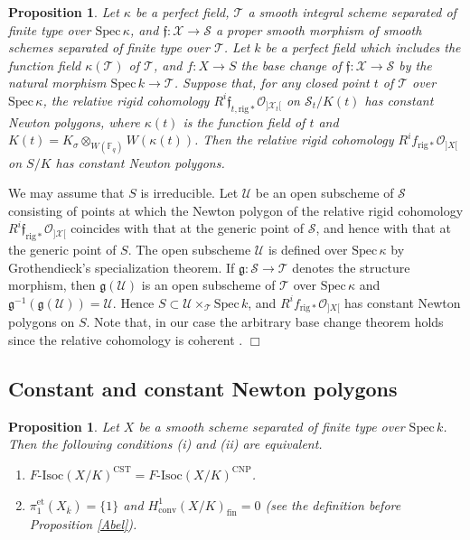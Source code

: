 \documentclass[11pt]{amsart}
\newtheorem{proposition}[Lemma]{Proposition}
\begin{document}
\begin{proposition}\label{geom} Let $\kappa$ be a perfect field, 
$\mathcal T$ a smooth integral scheme separated of finite type over 
$\mathrm{Spec}\, \kappa$, and $\mathfrak f : \mathcal X \rightarrow \mathcal S$ 
a proper smooth morphism of smooth schemes separated of finite type 
over $\mathcal T$. Let $k$ be a perfect field which includes 
the function field $\kappa(\mathcal T)$ of $\mathcal T$, and 
$f : X \rightarrow S$ the base change of $\mathfrak f : \mathcal X \rightarrow \mathcal S$ 
by the natural morphism $\mathrm{Spec}\, k \rightarrow \mathcal T$. 
Suppose that, for any closed point $t$ of $\mathcal T$ over $\mathrm{Spec}\, \kappa$, 
the relative rigid cohomology $R^i\mathfrak f_{t, \mathrm{rig}\ast}\mathcal O_{]{\mathcal X}_t[}$ 
on $\mathcal S_t/K(t)$ has constant Newton polygons, where 
$\kappa(t)$ is the function field of $t$ and 
$K(t) = K_\sigma\otimes_{W(\mathbb F_q)}W(\kappa(t))$. Then the 
relative rigid cohomology $R^if_{\mathrm{rig}\ast}\mathcal O_{]X[}$ 
on $S/K$ has constant Newton polygons. 
\end{proposition}

{ {We may assume that $S$ is irreducible. 
Let $\mathcal U$ be an open subscheme of $\mathcal S$ consisting of points 
at which the Newton polygon of the relative 
rigid cohomology $R^i\mathfrak f_{\mathrm{rig}\ast}\mathcal O_{]{\mathcal X}[}$ 
coincides with that at the generic point of $\mathcal S$, and hence with that at the generic point 
of $S$. The open subscheme $\mathcal U$ 
is defined over $\mathrm{Spec}\, \kappa$ by Grothendieck's 
specialization theorem. If $\mathfrak g : \mathcal S \rightarrow \mathcal T$ 
denotes the structure morphism, then $\mathfrak g(\mathcal U)$ 
is an open subscheme of $\mathcal T$ over $\mathrm{Spec}\, \kappa$ and 
$\mathfrak g^{-1}(\mathfrak g(\mathcal U)) = \mathcal U$. 
Hence $S \subset \mathcal U \times_{\mathcal T}\mathrm{Spec}\, k$, and 
$R^if_{\mathrm{rig}\ast}\mathcal O_{]X[}$ has constant Newton polygons on $S$. 
Note that, in our case the arbitrary base change theorem 
holds since the relative cohomology is coherent \cite[Corollary 2.3.3]{tsu}. 
} \hspace*{\fill} $\Box$}

\subsection{Constant and constant Newton polygons}

\begin{proposition}\label{equiv}
Let $X$ be a smooth scheme separated of finite type over $\mathrm{Spec}\, k$. Then the following conditions (i) and (ii) 
are equivalent.
\begin{enumerate}
\item[(i)] $F\mbox{-}\mathrm{Isoc}(X/K)^{\mathrm{CST}} = F\mbox{-}\mathrm{Isoc}(X/K)^{\mathrm{CNP}}$. 
\item[(ii)] $\pi_1^{\mathrm{et}}(X_{\overline{k}}) = \{ 1 \}$ and 
$H^1_{\mathrm{conv}}(X/K)_{\mathrm{fin}} = 0$ (see the definition before Proposition \ref{Abel}). 
\end{enumerate}
\end{proposition}
\end{document}

